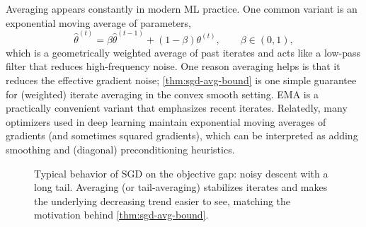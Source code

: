 Averaging appears constantly in modern ML practice.
One common variant is an exponential moving average of parameters,
\[
\hat\theta^{(t)} = \beta \hat\theta^{(t-1)} + (1-\beta)\theta^{(t)},
\qquad \beta \in (0,1),
\]
which is a geometrically weighted average of past iterates and acts like a low-pass filter that reduces high-frequency noise.
One reason averaging helps is that it reduces the effective gradient noise; \cref{thm:sgd-avg-bound} is one simple guarantee for (weighted) iterate averaging in the convex smooth setting.
EMA is a practically convenient variant that emphasizes recent iterates.
Relatedly, many optimizers used in deep learning maintain exponential moving averages of gradients (and sometimes squared gradients), which can be interpreted as adding smoothing and (diagonal) preconditioning heuristics.

\begin{figure}[t]
  \centering
  
  \caption{Typical behavior of SGD on the objective gap: noisy descent with a long tail.
  Averaging (or tail-averaging) stabilizes iterates and makes the underlying decreasing trend easier to see, matching the motivation behind \cref{thm:sgd-avg-bound}.}
  \label{fig:sgd-noisy-gap}
\end{figure}
